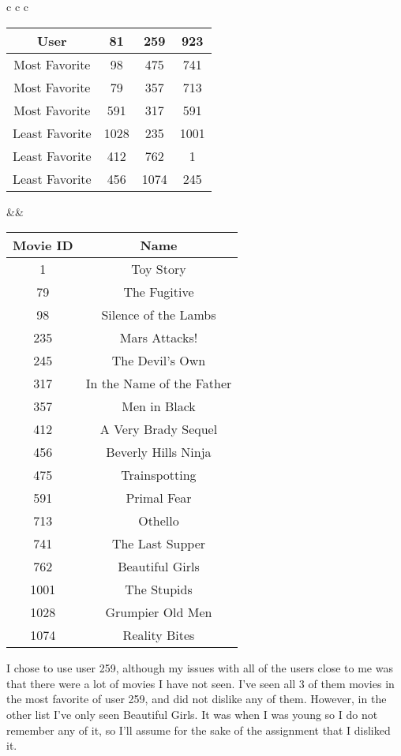 \documentclass[11pt]{report}
\begin{document}
\begin{center}
\begin{tabular}{c c c}
\begin{tabular}{|c|c|c|c|}
\hline
 User & 81 & 259 & 923 \\ \hline
\hline
Most Favorite & 98 & 475 & 741 \\ \hline
Most Favorite & 79 & 357 & 713 \\ \hline
Most Favorite & 591 & 317 & 591\\ \hline
Least Favorite & 1028 & 235 & 1001\\ \hline
Least Favorite & 412 & 762 & 1\\ \hline
Least Favorite & 456 & 1074 & 245\\ \hline
\end{tabular}  &&
\begin{tabular}{|c|c|}
\hline
 Movie ID & Name \\ \hline
\hline
1 & Toy Story\\ \hline
79 & The Fugitive\\ \hline
98 & Silence of the Lambs\\ \hline
235 & Mars Attacks!\\ \hline
245 & The Devil's Own\\ \hline
317 & In the Name of the Father\\ \hline
357 & Men in Black\\ \hline
412 & A Very Brady Sequel\\ \hline
456 & Beverly Hills Ninja\\ \hline
475 & Trainspotting\\ \hline
591 & Primal Fear\\ \hline
713 & Othello\\ \hline
741 & The Last Supper\\ \hline
762 & Beautiful Girls\\ \hline
1001 & The Stupids\\ \hline
1028 & Grumpier Old Men\\ \hline
1074 & Reality Bites\\ \hline
\end{tabular}
\end{tabular}

\end{center}
I chose to use user 259, although my issues with all of the users close to me was that there were a lot of movies I have not seen. I've seen all 3 of them movies in the most favorite of user 259, and did not dislike any of them. However, in the other list I've only seen Beautiful Girls. It was when I was young so I do not remember any of it, so I'll assume for the sake of the assignment that I disliked it.\\
\pagebreak
\end{document}
